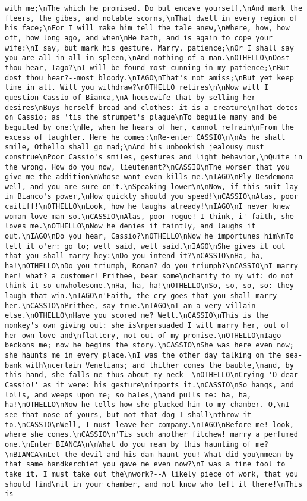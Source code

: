 \begin{verbatim}
with me;\nThe which he promised. Do but encave yourself,\nAnd mark the fleers, the gibes, and notable scorns,\nThat dwell in every region of his face;\nFor I will make him tell the tale anew,\nWhere, how, how oft, how long ago, and when\nHe hath, and is again to cope your wife:\nI say, but mark his gesture. Marry, patience;\nOr I shall say you are all in all in spleen,\nAnd nothing of a man.\nOTHELLO\nDost thou hear, Iago?\nI will be found most cunning in my patience;\nBut--dost thou hear?--most bloody.\nIAGO\nThat's not amiss;\nBut yet keep time in all. Will you withdraw?\nOTHELLO retires\n\nNow will I question Cassio of Bianca,\nA housewife that by selling her desires\nBuys herself bread and clothes: it is a creature\nThat dotes on Cassio; as 'tis the strumpet's plague\nTo beguile many and be beguiled by one:\nHe, when he hears of her, cannot refrain\nFrom the excess of laughter. Here he comes:\nRe-enter CASSIO\n\nAs he shall smile, Othello shall go mad;\nAnd his unbookish jealousy must construe\nPoor Cassio's smiles, gestures and light behavior,\nQuite in the wrong. How do you now, lieutenant?\nCASSIO\nThe worser that you give me the addition\nWhose want even kills me.\nIAGO\nPly Desdemona well, and you are sure on't.\nSpeaking lower\n\nNow, if this suit lay in Bianco's power,\nHow quickly should you speed!\nCASSIO\nAlas, poor caitiff!\nOTHELLO\nLook, how he laughs already!\nIAGO\nI never knew woman love man so.\nCASSIO\nAlas, poor rogue! I think, i' faith, she loves me.\nOTHELLO\nNow he denies it faintly, and laughs it out.\nIAGO\nDo you hear, Cassio?\nOTHELLO\nNow he importunes him\nTo tell it o'er: go to; well said, well said.\nIAGO\nShe gives it out that you shall marry hey:\nDo you intend it?\nCASSIO\nHa, ha, ha!\nOTHELLO\nDo you triumph, Roman? do you triumph?\nCASSIO\nI marry her! what? a customer! Prithee, bear some\ncharity to my wit: do not think it so unwholesome.\nHa, ha, ha!\nOTHELLO\nSo, so, so, so: they laugh that win.\nIAGO\n'Faith, the cry goes that you shall marry her.\nCASSIO\nPrithee, say true.\nIAGO\nI am a very villain else.\nOTHELLO\nHave you scored me? Well.\nCASSIO\nThis is the monkey's own giving out: she is\npersuaded I will marry her, out of her own love and\nflattery, not out of my promise.\nOTHELLO\nIago beckons me; now he begins the story.\nCASSIO\nShe was here even now; she haunts me in every place.\nI was the other day talking on the sea-bank with\ncertain Venetians; and thither comes the bauble,\nand, by this hand, she falls me thus about my neck--\nOTHELLO\nCrying 'O dear Cassio!' as it were: his gesture\nimports it.\nCASSIO\nSo hangs, and lolls, and weeps upon me; so hales,\nand pulls me: ha, ha, ha!\nOTHELLO\nNow he tells how she plucked him to my chamber. O,\nI see that nose of yours, but not that dog I shall\nthrow it to.\nCASSIO\nWell, I must leave her company.\nIAGO\nBefore me! look, where she comes.\nCASSIO\n'Tis such another fitchew! marry a perfumed one.\nEnter BIANCA\n\nWhat do you mean by this haunting of me?\nBIANCA\nLet the devil and his dam haunt you! What did you\nmean by that same handkerchief you gave me even now?\nI was a fine fool to take it. I must take out the\nwork?--A likely piece of work, that you should find\nit in your chamber, and not know who left it there!\nThis is 
\end{verbatim}
